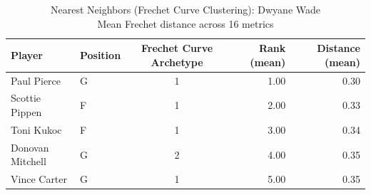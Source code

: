 \begin{table}[t]
\caption*{
{\fontsize{20}{25} Nearest Neighbors (Frechet Curve Clustering): Dwyane Wade\fontsize{12}{15}\selectfont } \\ 
{\fontsize{14}{17}\selectfont  Mean Frechet distance across 16 metrics\fontsize{12}{15}\selectfont }
} 
\fontsize{12.0pt}{14.0pt}\selectfont
\begin{tabular*}{\linewidth}{@{\extracolsep{\fill}}llcrr}
\toprule
Player & Position & Frechet Curve Archetype & Rank (mean) & Distance (mean) \\ 
\midrule\addlinespace[2.5pt]
Paul Pierce & G & 1 & 1.00 & 0.30 \\ 
Scottie Pippen & F & 1 & 2.00 & 0.33 \\ 
Toni Kukoc & F & 1 & 3.00 & 0.34 \\ 
Donovan Mitchell & G & 2 & 4.00 & 0.35 \\ 
Vince Carter & G & 1 & 5.00 & 0.35 \\ 
\bottomrule
\end{tabular*}
\end{table}

